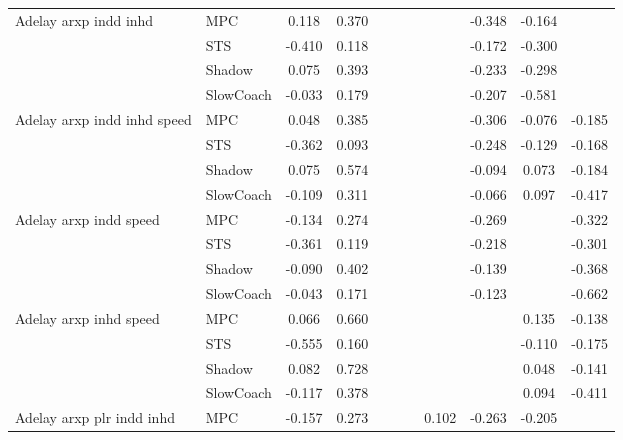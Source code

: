 \begin{tabular}{|l|l|*{9}{c|}}
\midrule
Adelay arxp indd inhd    & MPC &    0.118 &     0.370 &        &     &     &     &  -0.348 &  -0.164 &       \\
                              & STS &   -0.410 &     0.118 &        &     &     &     &  -0.172 &  -0.300 &       \\
                              & Shadow &    0.075 &     0.393 &        &     &     &     &  -0.233 &  -0.298 &       \\
                              & SlowCoach &   -0.033 &     0.179 &        &     &     &     &  -0.207 &  -0.581 &       \\
\midrule
Adelay arxp indd inhd speed    & MPC &    0.048 &     0.385 &        &     &     &     &  -0.306 &  -0.076 &   -0.185 \\
                              & STS &   -0.362 &     0.093 &        &     &     &     &  -0.248 &  -0.129 &   -0.168 \\
                              & Shadow &    0.075 &     0.574 &        &     &     &     &  -0.094 &   0.073 &   -0.184 \\
                              & SlowCoach &   -0.109 &     0.311 &        &     &     &     &  -0.066 &   0.097 &   -0.417 \\
\midrule
Adelay arxp indd speed    & MPC &   -0.134 &     0.274 &        &     &     &     &  -0.269 &      &   -0.322 \\
                              & STS &   -0.361 &     0.119 &        &     &     &     &  -0.218 &      &   -0.301 \\
                              & Shadow &   -0.090 &     0.402 &        &     &     &     &  -0.139 &      &   -0.368 \\
                              & SlowCoach &   -0.043 &     0.171 &        &     &     &     &  -0.123 &      &   -0.662 \\
\midrule
Adelay arxp inhd speed    & MPC &    0.066 &     0.660 &        &     &     &     &      &   0.135 &   -0.138 \\
                              & STS &   -0.555 &     0.160 &        &     &     &     &      &  -0.110 &   -0.175 \\
                              & Shadow &    0.082 &     0.728 &        &     &     &     &      &   0.048 &   -0.141 \\
                              & SlowCoach &   -0.117 &     0.378 &        &     &     &     &      &   0.094 &   -0.411 \\
\midrule
Adelay arxp plr indd inhd    & MPC &   -0.157 &     0.273 &        &     &     &  0.102 &  -0.263 &  -0.205 &       \\

\end{tabular}
